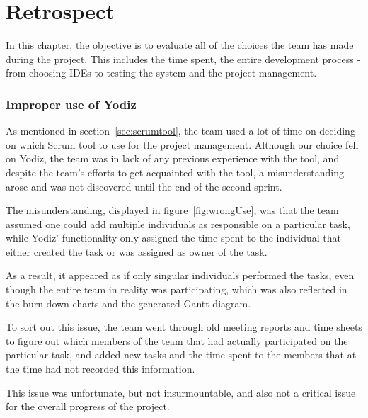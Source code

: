 \chapter{Retrospect}
In this chapter, the objective is to evaluate all of the choices the team has made during the project. This includes the time spent, the entire development process - from choosing IDEs to testing the system and the project management. 






\subsection{Improper use of Yodiz}
\label{sec:improperScrum}
As mentioned in section~\ref{sec:scrumtool}, the team used a lot of time on
deciding on which Scrum tool to use for the project management. Although our
choice fell on Yodiz, the team was in lack of any previous experience with the
tool, and despite the team's efforts to get acquainted with the tool, a
misunderstanding arose and was not discovered until the end of the second
sprint.

The misunderstanding, displayed in figure~\ref{fig:wrongUse}, was that the team
assumed one could add multiple individuals as responsible on a particular task,
while Yodiz' functionality only assigned the time spent to the individual that
either created the task or was assigned as owner of the task.

As a result, it appeared as if only singular individuals performed the tasks,
even though the entire team in reality was participating, which was also
reflected in the burn down charts and the generated Gantt diagram. 

To sort out this issue, the team went through old meeting reports and time sheets
to figure out which members of the team that had actually participated on the
particular task, and added new tasks and the time spent to the members that at
the time had not recorded this information.%

This issue was unfortunate, but not insurmountable, and also not a critical
issue for the overall progress of the project.

